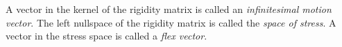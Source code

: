 A vector in the kernel of the rigidity matrix is called an {\it infinitesimal motion vector}.
The left nullspace of the rigidity matrix is called the {\it space of stress}. A vector in the stress space is called a {\it flex vector}. 











%



%

